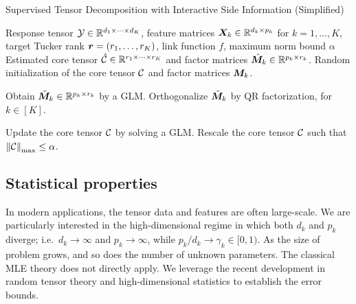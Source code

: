 \documentclass{article}
\theoremstyle{definition}
\theoremstyle{definition}
\begin{document}
\begin{algorithm}[!h]
\caption{Supervised Tensor Decomposition with Interactive Side Information (Simplified)}\label{alg:B}
\begin{algorithmic}[1]
\INPUT Response tensor $\mathcal{Y}\in \mathbb{R}^{d_1\times \cdots \times d_K}$, feature matrices $\bm X_k\in\mathbb{R}^{d_k\times p_k}$ for $k=1,\ldots,K$, target Tucker rank $\bm{r}=(r_1,\ldots,r_K)$, link function $f$, maximum norm bound $\alpha$
\OUTPUT Estimated core tensor $\hat {\mathcal{C}}\in\mathbb{R}^{r_1\times \cdots \times r_K}$ and factor matrices $\hat {\bm M}_k\in\mathbb{R}^{p_k\times r_k}$. 
\State Random initialization of the core tensor $\mathcal{C}$ and factor matrices $\bm M_k$. 

\State Obtain $\tilde {\bm M}_k\in\mathbb{R}^{p_k\times r_k}$ by a GLM. Orthogonalize $\tilde {\bm M}_k$ by QR factorization, for $k \in [K]$. 

\State Update the core tensor $\mathcal{C}$ by solving a GLM. Rescale the core tensor $\mathcal{C}$ such that $\left\lVert\mathcal{C}\right\rVert_{\max} \leq \alpha$. 
\EndWhile
\end{algorithmic}
\end{algorithm}

\subsection{Statistical properties}\label{subsec:statprob}

In modern applications, the tensor data and features are often large-scale. We are particularly interested in the high-dimensional regime in which both $d_k$ and $p_k$ diverge; i.e.\ $d_k\to \infty$ and $p_k\to\infty$, while $p_k/d_k \to \gamma_k \in[0,1)$. As the size of problem grows, and so does the number of unknown parameters. The classical MLE theory does not directly apply. We leverage the recent development in random tensor theory and high-dimensional statistics to establish the error bounds.
\end{document}
